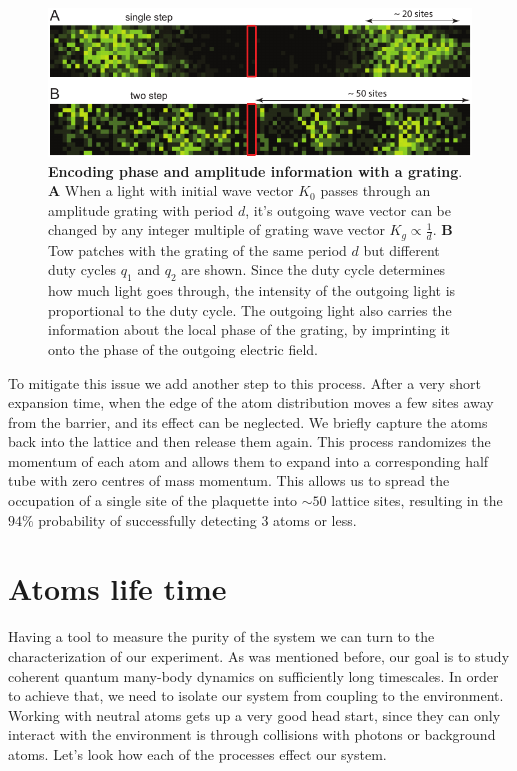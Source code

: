 \begin{figure}[t]
	\centering
	\includegraphics[scale=1]{figures/CTE_expansion.pdf}
	\caption{{\bf Encoding phase and amplitude information with a grating}. {\bf A} When a light with initial wave vector $K_0$ passes through an amplitude grating with period $d$, it's outgoing wave vector can be changed by any integer multiple of grating wave vector $K_g\propto \frac{1}{d}$. {\bf B} Tow patches with the grating of the same period $d$ but different duty cycles $q_1$ and $q_2$ are shown. Since the duty cycle determines how much light goes through, the intensity of the outgoing light is proportional to the duty cycle. The outgoing light also carries the information about the local phase of the grating, by imprinting it onto the phase of the outgoing electric field.}
	\label{fig:CTE_expansion}
\end{figure}

To mitigate this issue we add another step to this process. After a very short expansion time, when the edge of the atom distribution moves a few sites away from the barrier, and its effect can be neglected. We briefly capture the atoms back into the lattice and then release them again. This process randomizes the momentum of each atom and allows them to expand into a corresponding half tube with zero centres of mass momentum. This allows us to spread the occupation of a single site of the plaquette into $\sim 50$ lattice sites, resulting in the $94\%$ probability of successfully detecting $3$ atoms or less.

\section{Atoms life time}
Having a tool to measure the purity of the system we can turn to the characterization of our experiment. As was mentioned before, our goal is to study coherent quantum many-body dynamics on sufficiently long timescales. In order to achieve that, we need to isolate our system from coupling to the environment. Working with neutral atoms gets up a very good head start, since they can only interact with the environment is through collisions with photons or background atoms. Let's look how each of the processes effect our system.


